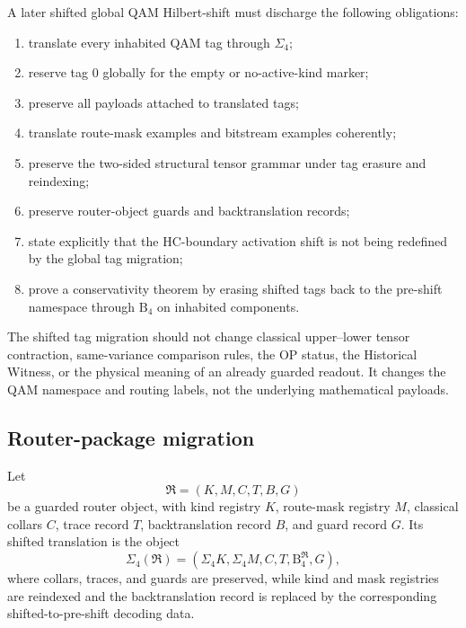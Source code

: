 \begin{definition}
\label{def:v3370-shifted-migration-obligation-list}
A later shifted global QAM Hilbert-shift must discharge the following obligations:
\begin{enumerate}[leftmargin=*]
 \item translate every inhabited QAM tag through $\Sigma_{4}$;
 \item reserve tag $0$ globally for the empty or no-active-kind marker;
 \item preserve all payloads attached to translated tags;
 \item translate route-mask examples and bitstream examples coherently;
 \item preserve the two-sided structural tensor grammar under tag erasure and
 reindexing;
 \item preserve router-object guards and backtranslation records;
 \item state explicitly that the HC-boundary activation shift is not being
 redefined by the global tag migration;
 \item prove a conservativity theorem by erasing shifted tags back to the
 pre-shift namespace through $\mathrm{B}_{4}$ on inhabited components.
\end{enumerate}
\end{definition}

\begin{remark}
\label{rem:v3370-what-is-not-migrated}
The shifted tag migration should not change classical upper--lower tensor
contraction, same-variance comparison rules, the OP status, the Historical
Witness, or the physical meaning of an already guarded readout. It changes
the QAM namespace and routing labels, not the underlying mathematical payloads.
\end{remark}

\subsection{Router-package migration}
\label{subsec:v3370-router-package-migration}

\begin{definition}
\label{def:v3370-router-package-translation}
Let
\[
 \mathfrak R=(K,M,C,T,B,G)
\]
be a guarded router object, with kind registry $K$, route-mask registry $M$,
classical collars $C$, trace record $T$, backtranslation record $B$, and guard
record $G$. Its shifted translation is the object
\[
 \Sigma_{4}(\mathfrak R)
 =
 (\Sigma_{4}K,\Sigma_{4}M,C,T,\mathrm{B}_{4}^{\mathfrak R},G),
\]
where collars, traces, and guards are preserved, while kind and mask registries
are reindexed and the backtranslation record is replaced by the corresponding
shifted-to-pre-shift decoding data.
\end{definition}

